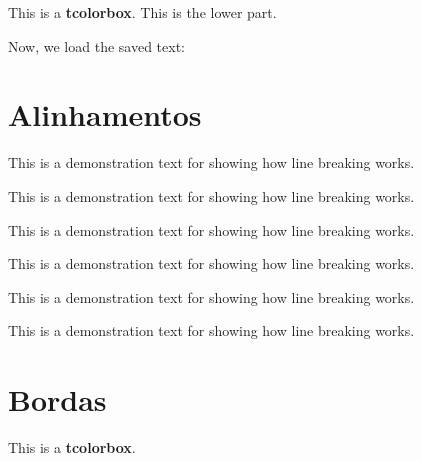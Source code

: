 \documentclass[11pt,a4paper]{article}
\begin{document}
\begin{tcolorbox}[saveto=\jobname_mysave2.tex]
This is a \textbf{tcolorbox}.
\tcblower
This is the lower part.
\end{tcolorbox}
Now, we load the saved text:
\begin{tcolorbox}[colframe=red,colback=red!10,
coltitle=black,colbacktitle=red!20,sidebyside,
title=Here we see the saved content including the lower part]

\end{tcolorbox}


\section{Alinhamentos}

\begin{tcolorbox}[adjusted title=flush center,halign=flush center]
This is a demonstration text for showing how line breaking works.
\end{tcolorbox}
\begin{tcolorbox}[adjusted title=flush left,halign=flush left]
This is a demonstration text for showing how line breaking works.
\end{tcolorbox}
\begin{tcolorbox}[adjusted title=flush right,halign=flush right]
This is a demonstration text for showing how line breaking works.
\end{tcolorbox}
\begin{tcolorbox}[adjusted title=center,halign=center]
This is a demonstration text for showing how line breaking works.
\end{tcolorbox}
\begin{tcolorbox}[adjusted title=left,halign=left]
This is a demonstration text for showing how line breaking works.
\end{tcolorbox}
\begin{tcolorbox}[adjusted title=right,halign upper=right]
This is a demonstration text for showing how line breaking works.
\end{tcolorbox}


\section{Bordas}

\begin{tcolorbox}[toprule=3mm]
This is a \textbf{tcolorbox}.
\end{tcolorbox}
\end{document}
